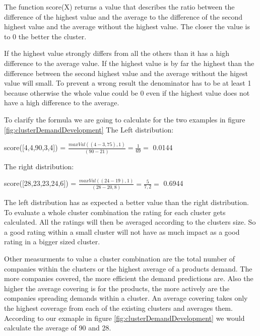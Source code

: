 The function score(X) returns a value that describes the ratio between the difference of the highest value and the
average to the difference of the second highest value and the average without the highest value. The closer the value
is to 0 the better the cluster.

If the highest value strongly differs from all the others than it has a high difference to the average value.
If the highest value is by far the highest than the difference between the second highest value and the average without
the higest value will small. To prevent a wrong result the denominator has to be at least 1 because otherwise the
whole value could be 0 even if the highest value does not have a high difference to the average.

To clarify the formula we are going to calculate for the two examples in figure \ref{fig:clusterDemandDevelopment}
The Left distribution:
\begin{center}
  score([4,4,90,3,4]) =  {\Large $\frac{ maxVal( ( 4 - 3,75 ), 1 ) }{ ( 90 - 21 ) } = \frac{ 1 }{ 69 } =$} 0.0144 \\
\end{center}

The right distribution:
\begin{center}
  score([28,23,23,24,6]) =  {\Large $\frac{ maxVal( ( 24 - 19 ), 1 ) }{ ( 28 - 20,8 ) } = \frac{ 5 }{ 7,2 } =$} 0.6944 \\
\end{center}


The left distribution has as expected a better value than the right distribution. To evaluate a whole cluster combination
the rating for each cluster gets calculated. All the ratings will then be averaged according to the clusters size.
So a good rating within a small cluster will not have as much impact as a good rating in a bigger sized cluster.

Other measurments to value a cluster combination are the total number of companies within the clusters or the
highest average of a products demand. The more companies covered, the more efficient the demand predictions are.
Also the higher the average covering is for the products, the more actively are the companies spreading demands
within a cluster. An average covering takes only the highest coverage from each of the existing clusters and averages
them. According to our exmaple in figure \ref{fig:clusterDemandDevelopment} we would calculate the average of 90 and 28.

























